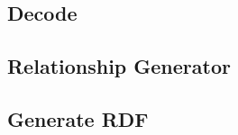 \subsection{Decode}
\label{Decode}

\subsection{Relationship Generator}
\label{Relationship Generator}

\subsection{Generate RDF}
\label{Generate RDF}


